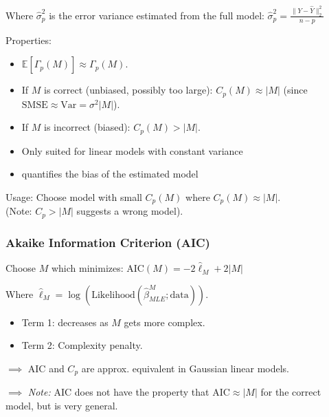 Where $\hat{\sigma}_p^2$ is the error variance estimated from the full model:
$\hat{\sigma}_p^2 = \frac{\|Y - \hat{Y}\|_2^2}{n-p}$

Properties:
\begin{itemize}
    \item $\mathbb{E}[\hat{\Gamma}_p(M)] \approx \Gamma_p(M)$.
    \item If $M$ is correct (unbiased, possibly too large): $C_p(M) \approx |M|$ (since $\text{SMSE} \approx \text{Var} = \sigma^2|M|$).
    \item If $M$ is incorrect (biased): $C_p(M) > |M|$.
    \item Only suited for linear models with constant variance
    \item quantifies the bias of the estimated
    model
\end{itemize}
Usage: Choose model with small $C_p(M)$ where $C_p(M) \approx |M|$.
\\ (Note: $C_p > |M|$ suggests a wrong model).

\subsubsection{Akaike Information Criterion (AIC)}
Choose $M$ which minimizes:
$\text{AIC}(M) = -2 \hat{\ell}_M + 2|M|$

Where $\hat{\ell}_M = \log(\text{Likelihood}(\hat{\beta}_{MLE}^M; \text{data}))$.
\begin{itemize}
    \item Term 1: decreases as $M$ gets more complex.
    \item Term 2: Complexity penalty.
\end{itemize}

$\implies$ AIC and $C_p$ are approx. equivalent in Gaussian linear models.

$\implies$ \textit{Note:} AIC does not have the property that $\text{AIC} \approx |M|$ for the correct model, but is very general.
